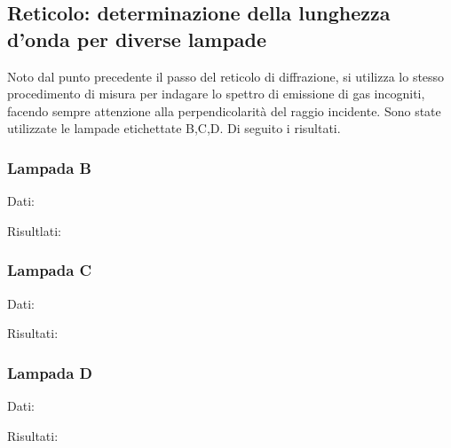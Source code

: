 \clearpage
\subsection{Reticolo: determinazione della lunghezza d'onda per diverse lampade}
Noto dal punto precedente il passo del reticolo di diffrazione, si utilizza lo stesso procedimento di misura per indagare lo spettro di emissione di gas incogniti, facendo sempre attenzione alla perpendicolarità del raggio incidente. Sono state utilizzate le lampade etichettate B,C,D. Di seguito i risultati.\\
\subsubsection{Lampada B}
Dati:

Risultlati:

%
\subsubsection{Lampada C}
Dati:

Risultati:

%
\subsubsection{Lampada D}
Dati:

Risultati:

%
%
